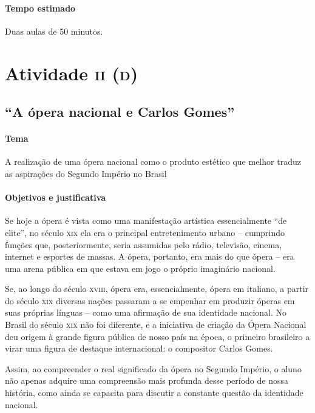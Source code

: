 \documentclass[11pt]{extarticle}
\begin{document}
\paragraph{Tempo estimado} Duas aulas de 50 minutos. 

 
\section{Atividade \textsc{ii (d)}}
\subsection{“A ópera nacional e Carlos Gomes”}


\paragraph{Tema} A realização de uma ópera nacional como o produto estético que melhor
traduz as aspirações do Segundo Império no Brasil 



\paragraph{Objetivos e justificativa}

Se hoje a ópera é vista como uma manifestação artística essencialmente “de
elite”, no século \textsc{xix} ela era o principal entretenimento urbano – cumprindo
funções que, posteriormente, seria assumidas pelo rádio, televisão, cinema,
internet e esportes de massas. A ópera, portanto, era mais do que ópera – era
uma arena pública em que estava em jogo o próprio imaginário nacional.

Se, ao longo do século \textsc{xviii}, ópera era, essencialmente, ópera em italiano, a
partir do século \textsc{xix} diversas nações passaram a se empenhar em produzir óperas
em suas próprias línguas – como uma afirmação de sua identidade nacional. No
Brasil do século \textsc{xix} não foi diferente, e a iniciativa de criação da Ópera
Nacional deu origem à grande figura pública de nosso país na época, o primeiro
brasileiro a virar uma figura de destaque internacional: o compositor Carlos
Gomes.


Assim, ao compreender o real significado da ópera no Segundo Império, o aluno
não apenas adquire uma compreensão mais profunda desse período de nossa
história, como ainda se capacita para discutir a constante questão da
identidade nacional.
\end{document}
